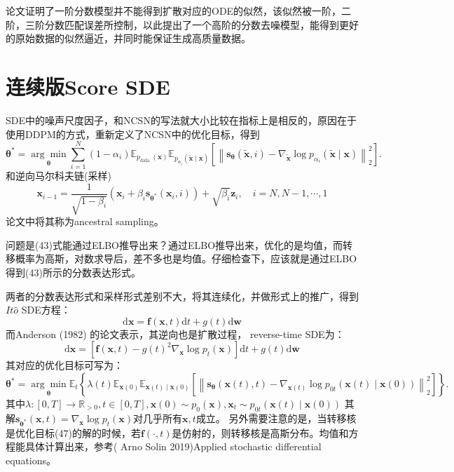 \documentclass[lang=cn,newtx,10pt,scheme=chinese]{elegantbook}
\begin{document}
论文证明了一阶分数模型并不能得到扩散对应的ODE的似然，该似然被一阶，二阶，三阶分数匹配误差所控制，以此提出了一个高阶的分数去噪模型，能得到更好的原始数据的似然逼近，并同时能保证生成高质量数据。

\section{连续版Score SDE}
SDE中的噪声尺度因子，和NCSN的写法就大小比较在指标上是相反的，原因在于使用DDPM的方式，重新定义了NCSN中的优化目标，得到
\begin{equation}
\boldsymbol{\theta}^*=\underset{\boldsymbol{\theta}}{\arg \min } \sum_{i=1}^N\left(1-\alpha_i\right) \mathbb{E}_{p_{\text {data }}(\mathbf{x})} \mathbb{E}_{p_{\alpha_i}(\tilde{\mathbf{x}} \mid \mathbf{x})}\left[\left\|\mathbf{s}_{\boldsymbol{\theta}}(\tilde{\mathbf{x}}, i)-\nabla_{\tilde{\mathbf{x}}} \log p_{\alpha_i}(\tilde{\mathbf{x}} \mid \mathbf{x})\right\|_2^2\right] .
\end{equation}
和逆向马尔科夫链(采样)
\begin{equation}
\mathbf{x}_{i-1}=\frac{1}{\sqrt{1-\beta_i}}\left(\mathbf{x}_i+\beta_i \mathbf{s}_{\boldsymbol{\theta}^*}\left(\mathbf{x}_i, i\right)\right)+\sqrt{\beta_i} \mathbf{z}_i, \quad i=N, N-1, \cdots, 1
\end{equation}
论文中将其称为ancestral sampling。

问题是(43)式能通过ELBO推导出来？通过ELBO推导出来，优化的是均值，而转移概率为高斯，对数求导后，差不多也是均值。仔细检查下，应该就是通过ELBO得到(43)所示的分数表达形式。

两者的分数表达形式和采样形式差别不大，将其连续化，并做形式上的推广，得到$It\hat{o}$ SDE方程：
\begin{equation}
\mathrm{d} \mathbf{x}=\mathbf{f}(\mathbf{x}, t) \mathrm{d} t+g(t) \mathrm{d} \mathbf{w}
\end{equation}
而Anderson (1982) 的论文表示，其逆向也是扩散过程， reverse-time SDE为：
\begin{equation}
\mathrm{d} \mathbf{x}=\left[\mathbf{f}(\mathbf{x}, t)-g(t)^2 \nabla_{\mathbf{x}} \log p_t(\mathbf{x})\right] \mathrm{d} t+g(t) \mathrm{d} \overline{\mathbf{w}}
\end{equation}
其对应的优化目标可写为：
\begin{equation}
\boldsymbol{\theta}^*=\underset{\boldsymbol{\theta}}{\arg \min } \mathbb{E}_t\left\{\lambda(t) \mathbb{E}_{\mathbf{x}(0)} \mathbb{E}_{\mathbf{x}(t) \mid \mathbf{x}(0)}\left[\left\|\mathbf{s}_{\boldsymbol{\theta}}(\mathbf{x}(t), t)-\nabla_{\mathbf{x}(t)} \log p_{0 t}(\mathbf{x}(t) \mid \mathbf{x}(0))\right\|_2^2\right]\right\} .
\end{equation}
其中$\lambda:[0, T] \rightarrow \mathbb{R}_{>0}, t\in [0, T], \mathbf{x}(0) \sim p_0(\mathbf{x}), \mathbf{x}_t \sim p_{0t}(\mathbf{x}(t) \mid \mathbf{x}(0))$
其解$\mathbf{s}_{\boldsymbol{\theta}^*}\left(\mathbf{x}, t\right)=\nabla_{\mathbf{x}} \log p_{t}(\mathbf{x})$对几乎所有$\mathbf{x}, t$成立。
另外需要注意的是，当转移核是优化目标(47)的解的时候，若$\mathbf{f}(\cdot, t)$是仿射的，则转移核是高斯分布。均值和方程能具体计算出来，参考( Arno Solin 2019)Applied stochastic differential equations。
\end{document}
